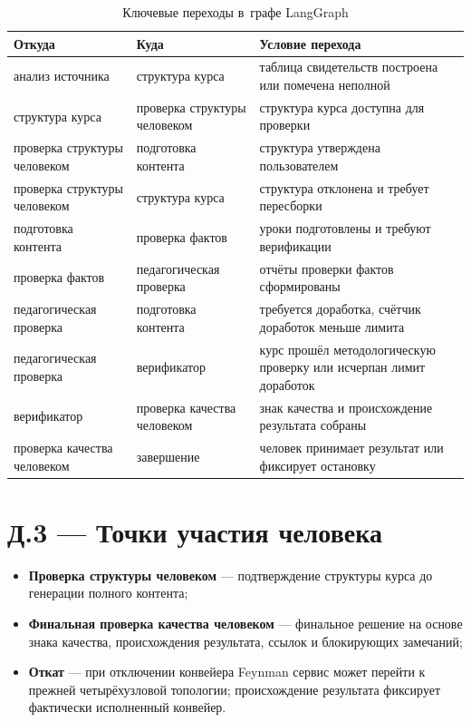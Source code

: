 \begin{table}[H]
  \caption{Ключевые переходы в~графе LangGraph}
  \label{tab:langgraph-edges}
  \centering
  {\small
  \setlength{\tabcolsep}{3pt}
  \renewcommand{\arraystretch}{1.12}
  \begin{tabular}{|P{4.0cm}|P{3.8cm}|P{5.1cm}|}
  \hline
  \textbf{Откуда} & \textbf{Куда} & \textbf{Условие перехода} \\
  \hline
  анализ источника & структура курса & таблица свидетельств построена или помечена неполной \\
  \hline
  структура курса & проверка структуры человеком & структура курса доступна для проверки \\
  \hline
  проверка структуры человеком & подготовка контента & структура утверждена пользователем \\
  \hline
  проверка структуры человеком & структура курса & структура отклонена и требует пересборки \\
  \hline
  подготовка контента & проверка фактов & уроки подготовлены и требуют верификации \\
  \hline
  проверка фактов & педагогическая проверка & отчёты проверки фактов сформированы \\
  \hline
  педагогическая проверка & подготовка контента & требуется доработка, счётчик доработок меньше лимита \\
  \hline
  педагогическая проверка & верификатор & курс прошёл методологическую проверку или исчерпан лимит доработок \\
  \hline
  верификатор & проверка качества человеком & знак качества и происхождение результата собраны \\
  \hline
  проверка качества человеком & завершение & человек принимает результат или фиксирует остановку \\
  \hline
  \end{tabular}
  }
\end{table}

\section*{Д.3 — Точки участия человека}

\begin{itemize}
  \item \textbf{Проверка структуры человеком} — подтверждение структуры курса
    до генерации полного контента;
  \item \textbf{Финальная проверка качества человеком} — финальное решение
    на основе знака качества,
    происхождения результата, ссылок и блокирующих замечаний;
  \item \textbf{Откат} — при отключении конвейера Feynman сервис может
    перейти к прежней четырёхузловой топологии; происхождение результата фиксирует
    фактически исполненный конвейер.
\end{itemize}
